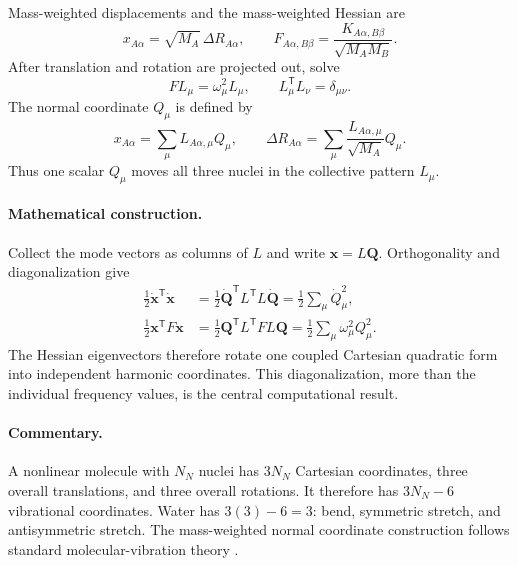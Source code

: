 \documentclass[10pt,twocolumn]{article}
\newcommand{\mathderiv}{\paragraph{Mathematical construction.}}
\newcommand{\commentaryblock}{\paragraph{Commentary.}}
\begin{document}
Mass-weighted displacements and the mass-weighted Hessian are
\begin{equation}
x_{A\alpha}=\sqrt{M_A}\,\Delta R_{A\alpha},
\qquad
F_{A\alpha,B\beta}=
\frac{K_{A\alpha,B\beta}}{\sqrt{M_AM_B}}.
\label{eq:mass-weight}
\end{equation}
After translation and rotation are projected out, solve
\begin{equation}
F L_\mu=\omega_\mu^2L_\mu,
\qquad L_\mu^{\mathsf T}L_\nu=\delta_{\mu\nu}.
\label{eq:normal-eigenproblem}
\end{equation}
The normal coordinate $Q_\mu$ is defined by
\begin{equation}
x_{A\alpha}=\sum_\mu L_{A\alpha,\mu}Q_\mu,
\qquad
\Delta R_{A\alpha}=\sum_\mu
\frac{L_{A\alpha,\mu}}{\sqrt{M_A}}Q_\mu.
\label{eq:normal-transform}
\end{equation}
Thus one scalar $Q_\mu$ moves all three nuclei in the collective pattern
$L_\mu$.

\mathderiv Collect the mode vectors as columns of $L$ and write
$\mathbf x=L\mathbf Q$.  Orthogonality and diagonalization give
\begin{align}
\frac12\dot{\mathbf x}^{\mathsf T}\dot{\mathbf x}
&=\frac12\dot{\mathbf Q}^{\mathsf T}
L^{\mathsf T}L\dot{\mathbf Q}
=\frac12\sum_\mu\dot Q_\mu^2,\nonumber\\
\frac12\mathbf x^{\mathsf T}F\mathbf x
&=\frac12\mathbf Q^{\mathsf T}
L^{\mathsf T}FL\mathbf Q
=\frac12\sum_\mu\omega_\mu^2Q_\mu^2.
\label{eq:mode-decoupling}
\end{align}
The Hessian eigenvectors therefore rotate one coupled Cartesian quadratic form
into independent harmonic coordinates.  This diagonalization, more than the
individual frequency values, is the central computational result.

\commentaryblock A nonlinear molecule with $N_N$ nuclei has $3N_N$ Cartesian
coordinates, three overall translations, and three overall rotations.  It
therefore has $3N_N-6$ vibrational coordinates.  Water has $3(3)-6=3$:
bend, symmetric stretch, and antisymmetric stretch.  The mass-weighted normal
coordinate construction follows standard molecular-vibration theory
\cite{Wilson}.
\end{document}

